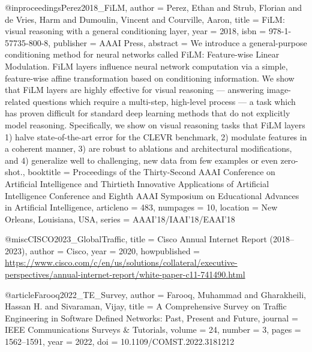 @inproceedings{Perez2018_FiLM,
author = {Perez, Ethan and Strub, Florian and de Vries, Harm and Dumoulin, Vincent and Courville, Aaron},
title = {{FiLM: visual reasoning with a general conditioning layer}},
year = {2018},
isbn = {978-1-57735-800-8},
publisher = {AAAI Press},
abstract = {We introduce a general-purpose conditioning method for neural networks called FiLM: Feature-wise Linear Modulation. FiLM layers influence neural network computation via a simple, feature-wise affine transformation based on conditioning information. We show that FiLM layers are highly effective for visual reasoning — answering image-related questions which require a multi-step, high-level process — a task which has proven difficult for standard deep learning methods that do not explicitly model reasoning. Specifically, we show on visual reasoning tasks that FiLM layers 1) halve state-of-the-art error for the CLEVR benchmark, 2) modulate features in a coherent manner, 3) are robust to ablations and architectural modifications, and 4) generalize well to challenging, new data from few examples or even zero-shot.},
booktitle = {Proceedings of the Thirty-Second AAAI Conference on Artificial Intelligence and Thirtieth Innovative Applications of Artificial Intelligence Conference and Eighth AAAI Symposium on Educational Advances in Artificial Intelligence},
articleno = {483},
numpages = {10},
location = {New Orleans, Louisiana, USA},
series = {AAAI'18/IAAI'18/EAAI'18}
}


@misc{CISCO2023_GlobalTraffic,
    title  = {{Cisco Annual Internet Report (2018--2023)}},
    author = {{Cisco}},
    year   = {2020},
    howpublished = {\url{https://www.cisco.com/c/en/us/solutions/collateral/executive-perspectives/annual-internet-report/white-paper-c11-741490.html}}
}




@article{Farooq2022_TE_Survey,
    author  = {Farooq, Muhammad and Gharakheili, Hassan H. and Sivaraman, Vijay},
    title   = {A Comprehensive Survey on Traffic Engineering in Software Defined Networks: Past, Present and Future},
    journal = {IEEE Communications Surveys \& Tutorials},
    volume  = {24},
    number  = {3},
    pages   = {1562--1591},
    year    = {2022},
    doi     = {10.1109/COMST.2022.3181212}
}


